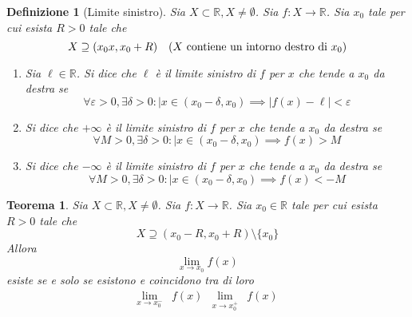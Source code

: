 \documentclass[11pt]{book}
\newtheorem{theorem}{Teorema}[chapter]
\newtheorem{definition}{Definizione}[chapter]
\begin{document}
\begin{definition}[Limite sinistro]
    Sia $X\subset\mathbb{R},X\neq\emptyset$. Sia $f:X\rightarrow\mathbb{R}$. Sia $x_0$ tale per cui esista $R>0$ tale che 
    \begin{equation*}
        X\supseteq(x_0x,x_0+R)\quad\textnormal{($X$ contiene un intorno destro di $x_0$)}
    \end{equation*}
    \begin{enumerate}
        \item Sia $\ell\in\mathbb{R}$. Si dice che $\ell$ è il limite sinistro di $f$ per $x$ che tende a $x_0$ da destra 
        se 
        \begin{equation*}
            \forall\varepsilon>0,\exists\delta>0:|x\in(x_0-\delta,x_0)\implies|f(x)-\ell|<\varepsilon
        \end{equation*}
        \item Si dice che $+\infty$ è il limite sinistro di $f$ per $x$ che tende a $x_0$ da destra 
        se 
        \begin{equation*}
            \forall M>0,\exists\delta>0:|x\in(x_0-\delta,x_0)\implies f(x)>M
        \end{equation*}
        \item Si dice che $-\infty$ è il limite sinistro di $f$ per $x$ che tende a $x_0$ da destra 
        se 
        \begin{equation*}
            \forall M>0,\exists\delta>0:|x\in(x_0-\delta,x_0)\implies f(x)<-M
        \end{equation*}
    \end{enumerate}
\end{definition}
\begin{theorem}
    Sia $X\subset\mathbb{R},X\neq\emptyset$. Sia $f:X\rightarrow\mathbb{R}$. Sia $x_0\in\mathbb{R}$ tale per cui esista
    $R>0$ tale che 
    \begin{equation*}
        X\supseteq(x_0-R,x_0+R)\setminus\{x_0\}
    \end{equation*}
    Allora
    \begin{equation*}
        \lim_{x\rightarrow x_0}f(x)
    \end{equation*}
    esiste se e solo se esistono e coincidono tra di loro 
    \begin{align*}
        \lim_{x\rightarrow x_0^-}&f(x) & \lim_{x\rightarrow x_0^+}&f(x)
    \end{align*}
\end{theorem}
\end{document}
